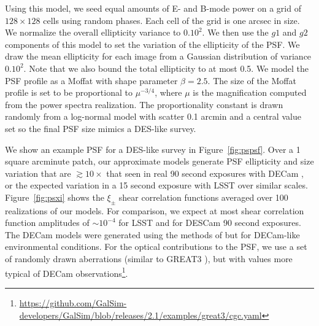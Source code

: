 \documentclass[fleqn,useAMS,usenatbib]{mnras}
\begin{document}
Using this model, we seed equal amounts of E- and B-mode power on a grid of
$128\times128$ cells using random phases. Each cell of the grid is one
arcsec in size. We normalize the overall ellipticity variance to $0.10^2$. We then use
the $g1$ and $g2$ components of this model to set the variation of the ellipticity of
the PSF. We draw the mean ellipticity for each image from a Gaussian distribution of
variance $0.10^2$. Note that we also bound the total ellipticity to at most 0.5.
We model the PSF profile as a Moffat with shape parameter $\beta=2.5$.
The size of the Moffat profile is set to be proportional to $\mu^{-3/4}$,
where $\mu$ is the magnification computed from the power spectra realization. The
proportionality constant is drawn randomly from a log-normal model with
scatter 0.1 arcmin and a central value set so the final PSF size mimics a DES-like
survey.

We show an example PSF for a DES-like survey in Figure~\ref{fig:pspsf}.  Over a
1 square arcminute patch, our approximate models generate PSF ellipticity and size
variation that are $\gtrsim10\times$ that seen in real 90 second exposures
with DECam \citep{DESY1shear}, or the expected variation in a 15 second exposure with
LSST \citep{jee2011} over similar scales. Figure~\ref{fig:psxi} shows the $\xi_{\pm}$ shear correlation
functions averaged over 100 realizations of our models. For comparison, we
expect at most shear correlation function amplitudes of $\sim10^{-4}$ for LSST
\citep{jee2011} and for DESCam 90 second exposures. The DECam models were generated
using the methods of \citet{jee2011} but for DECam-like environmental conditions. For
the optical contributions to the PSF, we use a set of randomly drawn
aberrations (similar to GREAT3 \citep{great3}), but with values more typical of
DECam observations\footnote{\url{https://github.com/GalSim-developers/GalSim/blob/releases/2.1/examples/great3/cgc.yaml}}.


\bsp
\label{lastpage}
\end{document}
